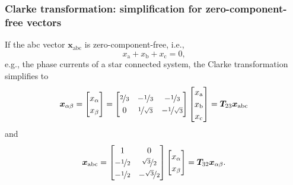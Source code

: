 \begin{frame}
	\frametitle{Clarke transformation: simplification for zero-component-free vectors}
    If the abc vector $\bm{x}_\mathrm{abc}$ is zero-component-free, i.e.,  $$x_\mathrm{a} + x_\mathrm{b} +x_\mathrm{c} = 0,$$
    e.g., the phase currents of a star connected system, the Clarke transformation simplifies to
    \begin{equation}
        \renewcommand{\arraystretch}{1.2}
        \bm{x}_{\alpha \beta} = \begin{bmatrix} x_\alpha \\ x_\beta \end{bmatrix} = \begin{bmatrix}
            \nicefrac{2}{3} & -\nicefrac{1}{3} & -\nicefrac{1}{3}\\
            0 & \nicefrac{1}{\sqrt{3}} & -\nicefrac{1}{\sqrt{3}}
        \end{bmatrix} \begin{bmatrix} x_\mathrm{a} \\ x_\mathrm{b} \\ x_\mathrm{c}\end{bmatrix} = \bm{T}_{23} \bm{x}_\mathrm{abc}
        \label{eq:Clarke_transformation_zero_component_free}
    \end{equation}
    and
    \begin{equation}
        \renewcommand{\arraystretch}{1.2}
        \bm{x}_\mathrm{abc}  = \begin{bmatrix}
            1 & 0\\
            -\nicefrac{1}{2} & \nicefrac{\sqrt{3}}{2}\\
            -\nicefrac{1}{2} & -\nicefrac{\sqrt{3}}{2}
        \end{bmatrix} \begin{bmatrix} x_\alpha \\ x_\beta \end{bmatrix} = \bm{T}_{32} \bm{x}_{\alpha \beta}.
    \end{equation}     
\end{frame}

